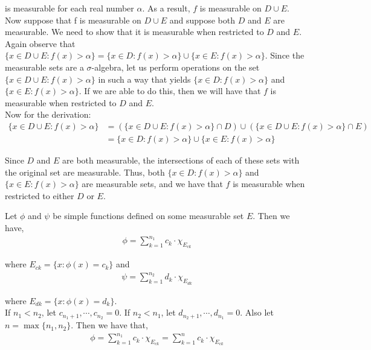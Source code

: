 \documentclass[12pt]{article}
\newenvironment{problem}[2][Problem]{\begin{trivlist}
\item[\hskip \labelsep {\bfseries #1}\hskip \labelsep {\bfseries #2.}]}{\end{trivlist}}
\begin{document}
is measurable for each real number $\alpha$. As a result, $f$ is measurable on $D \cup E$.\\

Now suppose that f is measurable on $D \cup E$ and suppose both $D$ and $E$ are measurable. We need to show that it is measurable when restricted to $D$ and $E$.\\

Again observe that $\{x \in D \cup E: f(x) > \alpha\} = \{x \in D: f(x) > \alpha\} \cup \{x \in E: f(x) > \alpha\}$. Since the measurable sets are a $\sigma$-algebra, let us perform operations on the set $\{x \in D \cup E: f(x) > \alpha\}$ in such a way that yields $\{x \in D: f(x) > \alpha\}$ and  $\{x \in E: f(x) > \alpha\}$. If we are able to do this, then we will have that $f$ is measurable when restricted to $D$ and $E$.\\

Now for the derivation:
\begin{align*}
\{x \in D \cup E: f(x) > \alpha\} &= (\{x \in D \cup E: f(x) > \alpha\} \cap D) \cup (\{x \in D \cup E: f(x) > \alpha\} \cap E)\\
&= \{x \in D: f(x) > \alpha\} \cup \{x \in E: f(x) > \alpha\}
\end{align*}

Since $D$ and $E$ are both measurable, the intersections of each of these sets with the original set are measurable. Thus, both $\{x \in D: f(x) > \alpha\}$ and $\{x \in E: f(x) > \alpha\}$ are measurable sets, and we have that $f$ is measurable when restricted to either $D$ or $E$.

\begin{problem}{4}
\end{problem}

Let $\phi$ and $\psi$ be simple functions defined on some measurable set $E$. Then we have,
\begin{align*}
\phi = \sum_{k=1}^{n_1} c_{k} \cdot \chi_{E_{ck}}
\end{align*}

where $E_{ck} = \{x: \phi(x) = c_{k}\}$ and 
\begin{align*}
\psi = \sum_{k=1}^{n_2} d_{k} \cdot \chi_{E_{dk}}
\end{align*}

where $E_{dk} = \{x: \phi(x) = d_{k}\}$.\\

If $n_1 < n_2$, let $c_{n_1 + 1}, \cdots, c_{n_2} = 0$. If $n_2 < n_1$, let $d_{n_2 + 1}, \cdots, d_{n_1} = 0$. Also let $n = \max\{n_1, n_2\}$. Then we have that,
\begin{align*}
\phi = \sum_{k=1}^{n_1} c_{k} \cdot \chi_{E_{ck}} = \sum_{k=1}^{n} c_{k} \cdot \chi_{E_{ck}}
\end{align*}
\end{document}
